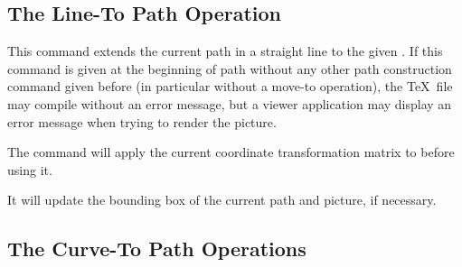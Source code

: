 \subsection{The Line-To Path Operation}

\begin{command}{\pgfpathlineto{}}
    This command extends the current path in a straight line to the given
    . If this command is given at the beginning of path
    without any other path construction command given before (in particular
    without a move-to operation), the \TeX\ file may compile without an error
    message, but a viewer application may display an error message when trying
    to render the picture.
\begin{codeexample}[]
\begin{pgfpicture}
  \pgfpathmoveto{\pgfpointorigin}
  \pgfpathlineto{\pgfpoint{1cm}{1cm}}
  \pgfpathlineto{\pgfpoint{2cm}{1cm}}
\end{pgfpicture}
\end{codeexample}
    The command will apply the current coordinate transformation matrix to
     before using it.

    It will update the bounding box of the current path and picture, if
    necessary.
\end{command}


\subsection{The Curve-To Path Operations}

